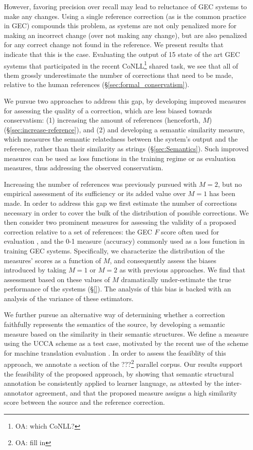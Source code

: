 \documentclass[english]{article}
\newcommand{\oa}[1]{\footnote{\color{red}OA: #1}}
\begin{document}
However, favoring precision over recall may lead to reluctance of GEC systems to make any
changes. Using a single reference correction (as is the common practice in GEC) compounds
this problem, as systems are not only penalized more for making an incorrect change (over not making
any change), but are also penalized for any correct change not found in the reference.
We present results that indicate that this is the case. Evaluating the output of 15 state of the art
GEC systems that participated in the recent CoNLL\oa{which CoNLL?} shared task, we see that all of them
grossly underestimate the number of corrections that need to be made, relative to the human references
(\S\ref{sec:formal_conservatism}). 

We pursue two approaches to address this gap, by developing improved measures for assessing 
the quality of a correction, which are less biased towards conservatism:
(1) increasing the amount of references (henceforth, $M$) (\S\ref{sec:increase-reference}),
and (2) and developing a semantic similarity measure, which measures the semantic relatedness
between the system's output and the reference, rather than their similarity
as strings (\S\ref{sec:Semantics}). Such improved measures can be used as
loss functions in the training regime or as evaluation measures,
thus addressing the observed conservatism.

Increasing the number of references was previously pursued with $M=2$,
but no empirical assessment of its sufficiency or its added value over $M=1$ has been made.
In order to address this gap we first estimate the number of corrections necessary in order
to cover the bulk of the distribution of possible corrections.
We then consider two prominent measures for assessing the validity of a proposed correction
relative to a set of references: the GEC $F$ score often used for evaluation \cite{M2},
and the 0-1 measure (accuracy) commonly used as a loss function in training GEC systems.
Specifically, we characterize the distribution of the measures' scores
as a function of $M$, and consequently assess the biases introduced by taking $M=1$ or $M=2$
as with previous approaches. 
We find that assessment based on these values of $M$ dramatically under-estimate the
true performance of the systems (\S\ref{}). 
The analysis of this bias is backed with an analysis of the variance of these estimators.

We further pursue an alternative way of determining whether a correction faithfully
represents the semantics of the source, by developing a semantic measure based on the similarity
in their semantic structures. We define a measure using the UCCA scheme \cite{abend2013universal} as a
test case, motivated by the recent use of the scheme for machine translation evaluation \cite{birch2016hume}.
In order to assess the feasiblity of this approach, we annotate a section of the ???\oa{fill in}
parallel corpus. Our results support the feasibility of the proposed approach,
by showing that semantic structural annotation be consistently applied
to learner language, as attested by the inter-annotator agreement,
and that the proposed measure assigns a high similarity score between the source and the reference
correction.
\end{document}
